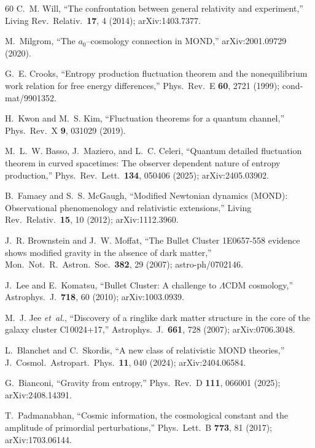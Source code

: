 \documentclass[prd,twocolumn,superscriptaddress,longbibliography,floatfix]{revtex4-2}
\begin{document}
\begin{thebibliography}{60}
C.~M. Will,
``The confrontation between general relativity and experiment,''
Living Rev.\ Relativ.\ \textbf{17}, 4 (2014);
arXiv:1403.7377.

M.~Milgrom,
``The $a_0$--cosmology connection in MOND,''
arXiv:2001.09729 (2020).

G.~E. Crooks,
``Entropy production fluctuation theorem and the nonequilibrium
work relation for free energy differences,''
Phys.\ Rev.\ E \textbf{60}, 2721 (1999);
cond-mat/9901352.

H.~Kwon and M.~S. Kim,
``Fluctuation theorems for a quantum channel,''
Phys.\ Rev.\ X \textbf{9}, 031029 (2019).

M.~L.~W. Basso, J.~Maziero, and L.~C. Celeri,
``Quantum detailed fluctuation theorem in curved spacetimes:
The observer dependent nature of entropy production,''
Phys.\ Rev.\ Lett.\ \textbf{134}, 050406 (2025);
arXiv:2405.03902.

B.~Famaey and S.~S. McGaugh,
``Modified Newtonian dynamics (MOND): Observational
phenomenology and relativistic extensions,''
Living Rev.\ Relativ.\ \textbf{15}, 10 (2012);
arXiv:1112.3960.

J.~R. Brownstein and J.~W. Moffat,
``The Bullet Cluster 1E0657-558 evidence shows modified gravity
in the absence of dark matter,''
Mon.\ Not.\ R.\ Astron.\ Soc.\ \textbf{382}, 29 (2007);
astro-ph/0702146.

J.~Lee and E.~Komatsu,
``Bullet Cluster: A challenge to $\Lambda$CDM cosmology,''
Astrophys.\ J.\ \textbf{718}, 60 (2010);
arXiv:1003.0939.

M.~J. Jee \emph{et~al.},
``Discovery of a ringlike dark matter structure in the core of
the galaxy cluster Cl\,0024+17,''
Astrophys.\ J.\ \textbf{661}, 728 (2007);
arXiv:0706.3048.

L.~Blanchet and C.~Skordis,
``A new class of relativistic MOND theories,''
J.\ Cosmol.\ Astropart.\ Phys.\ \textbf{11}, 040 (2024);
arXiv:2404.06584.

G.~Bianconi,
``Gravity from entropy,''
Phys.\ Rev.\ D \textbf{111}, 066001 (2025);
arXiv:2408.14391.

T.~Padmanabhan,
``Cosmic information, the cosmological constant and the
amplitude of primordial perturbations,''
Phys.\ Lett.\ B \textbf{773}, 81 (2017);
arXiv:1703.06144.


\end{thebibliography}
\end{document}
